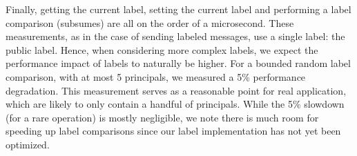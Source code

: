 Finally, getting the current label, setting the current label and
performing a label comparison (subsumes) are all on the order of a
microsecond.
%
These measurements, as in the case of sending labeled messages, use
a single label: the public label.
%
Hence, when considering more complex labels, we expect the performance
impact of labels to naturally be higher.
%
For a bounded random label comparison, with at most 5 principals, we
measured a 5\% performance degradation.
%
This measurement serves as a reasonable point for real application,
which are likely to only contain a handful of principals.
%
While the 5\% slowdown (for a rare operation) is mostly negligible, we
note there is much room for speeding up label comparisons since our
label implementation has not yet been optimized.


